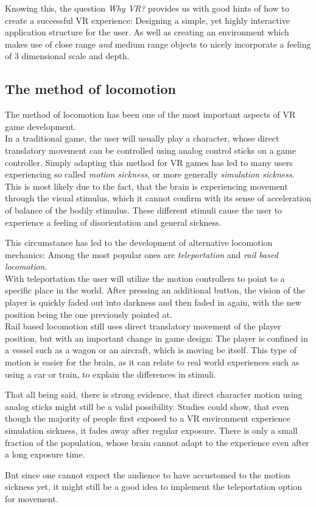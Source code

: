 Knowing this, the question \textit{Why VR?} provides us with good hints of how to create a successful VR experience: Designing a simple, yet highly interactive application structure for the user. As well as creating an environment which makes use of close range \textit{and} medium range objects to nicely incorporate a feeling of 3 dimensional scale and depth.

\subsection{The method of locomotion}

The method of locomotion has been one of the most important aspects of VR game development.\\
In a traditional game, the user will usually play a character, whose direct translatory movement can be controlled using analog control sticks on a game controller. Simply adapting this method for VR games has led to many users experiencing so called \textit{motion sickness}, or more generally \textit{simulation sickness}. This is most likely due to the fact, that the brain is experiencing movement through the visual stimulus, which it cannot confirm with its sense of acceleration of balance of the bodily stimulus. These different stimuli cause the user to experience a feeling of disorientation and general sickness.

This circumstance has led to the development of alternative locomotion mechanics: Among the most popular ones are \textit{teleportation} and \textit{rail based locomotion}.\\
With teleportation the user will utilize the motion controllers to point to a specific place in the world. After pressing an additional button, the vision of the player is quickly faded out into darkness and then faded in again, with the new position being the one previously pointed at.\\
Rail based locomotion still uses direct translatory movement of the player position, but with an important change in game design: The player is confined in a vessel such as a wagon or an aircraft, which is moving be itself. This type of motion is easier for the brain, as it can relate to real world experiences such as using a car or train, to explain the differences in stimuli.

That all being said, there is strong evidence, that direct character motion using analog sticks might still be a valid possibility. Studies could show, that even though the majority of people first exposed to a VR environment experience simulation sickness, it fades away after regular exposure. There is only a small fraction of the population, whose brain cannot adapt to the experience even after a long exposure time.

But since one cannot expect the audience to have accustomed to the motion sickness yet, it might still be a good idea to implement the teleportation option for movement.